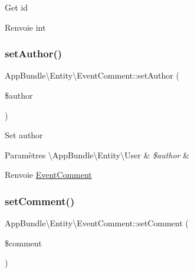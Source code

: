 Get id

\begin{DoxyReturn}{Renvoie}
int 
\end{DoxyReturn}
\mbox{\label{classAppBundle_1_1Entity_1_1EventComment_a99fe91a4d8b27dbf20237cfe72ffdbae}} 
\subsubsection{\texorpdfstring{set\+Author()}{setAuthor()}}
{\footnotesize\ttfamily App\+Bundle\textbackslash{}\+Entity\textbackslash{}\+Event\+Comment\+::set\+Author (\begin{DoxyParamCaption}\item[{\textbackslash{}\hyperlink{classAppBundle_1_1Entity_1_1User}{App\+Bundle\textbackslash{}\+Entity\textbackslash{}\+User}}]{\$author }\end{DoxyParamCaption})}

Set author


\begin{DoxyParams}[1]{Paramètres}
\textbackslash{}\+App\+Bundle\textbackslash{}\+Entity\textbackslash{}\+User & {\em \$author} & \\
\hline
\end{DoxyParams}
\begin{DoxyReturn}{Renvoie}
\hyperlink{classAppBundle_1_1Entity_1_1EventComment}{Event\+Comment} 
\end{DoxyReturn}
\mbox{\label{classAppBundle_1_1Entity_1_1EventComment_a6e64399a96d509fd4db92483983b8212}} 
\subsubsection{\texorpdfstring{set\+Comment()}{setComment()}}
{\footnotesize\ttfamily App\+Bundle\textbackslash{}\+Entity\textbackslash{}\+Event\+Comment\+::set\+Comment (\begin{DoxyParamCaption}\item[{}]{\$comment }\end{DoxyParamCaption})}

